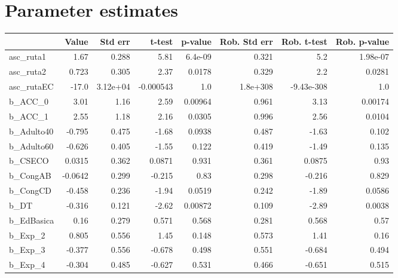 \section{Parameter estimates}
\begin{tabular}{lrrrrrrr}
\toprule
{} &   Value &  Std err &    t-test &  p-value &  Rob. Std err &  Rob. t-test &  Rob. p-value \\
\midrule
asc\_ruta1      &    1.67 &    0.288 &      5.81 &  6.4e-09 &         0.321 &          5.2 &      1.98e-07 \\
asc\_ruta2      &   0.723 &    0.305 &      2.37 &   0.0178 &         0.329 &          2.2 &        0.0281 \\
asc\_rutaEC     &   -17.0 & 3.12e+04 & -0.000543 &      1.0 &      1.8e+308 &   -9.43e-308 &           1.0 \\
b\_ACC\_0        &    3.01 &     1.16 &      2.59 &  0.00964 &         0.961 &         3.13 &       0.00174 \\
b\_ACC\_1        &    2.55 &     1.18 &      2.16 &   0.0305 &         0.996 &         2.56 &        0.0104 \\
b\_Adulto40     &  -0.795 &    0.475 &     -1.68 &   0.0938 &         0.487 &        -1.63 &         0.102 \\
b\_Adulto60     &  -0.626 &    0.405 &     -1.55 &    0.122 &         0.419 &        -1.49 &         0.135 \\
b\_CSECO        &  0.0315 &    0.362 &    0.0871 &    0.931 &         0.361 &       0.0875 &          0.93 \\
b\_CongAB       & -0.0642 &    0.299 &    -0.215 &     0.83 &         0.298 &       -0.216 &         0.829 \\
b\_CongCD       &  -0.458 &    0.236 &     -1.94 &   0.0519 &         0.242 &        -1.89 &        0.0586 \\
b\_DT           &  -0.316 &    0.121 &     -2.62 &  0.00872 &         0.109 &        -2.89 &        0.0038 \\
b\_EdBasica     &    0.16 &    0.279 &     0.571 &    0.568 &         0.281 &        0.568 &          0.57 \\
b\_Exp\_2        &   0.805 &    0.556 &      1.45 &    0.148 &         0.573 &         1.41 &          0.16 \\
b\_Exp\_3        &  -0.377 &    0.556 &    -0.678 &    0.498 &         0.551 &       -0.684 &         0.494 \\
b\_Exp\_4        &  -0.304 &    0.485 &    -0.627 &    0.531 &         0.466 &       -0.651 &         0.515 \\

\end{tabular}
